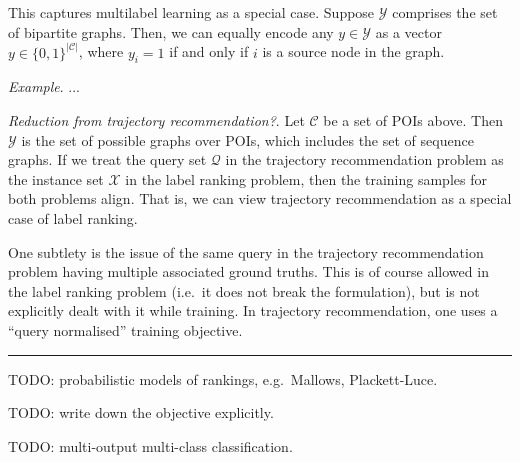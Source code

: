 \documentclass{article}
\newcommand{\eg}{e.g.\ }
\newcommand{\ie}{i.e.\ }
\newcommand{\CCal}{\mathscr{C}}
\newcommand{\QCal}{\mathscr{Q}}
\newcommand{\XCal}{\mathscr{X}}
\newcommand{\YCal}{\mathscr{Y}}
\begin{document}
This captures multilabel learning as a special case.
Suppose $\YCal$ comprises the set of bipartite graphs.
Then, we can equally encode any $y \in \YCal$
as a vector $y \in \{ 0, 1 \}^{|\CCal|}$,
where $y_i = 1$ if and only if $i$ is a source node in the graph.

\emph{Example}.
...

\emph{Reduction from trajectory recommendation?}.
Let $\CCal$ be a set of POIs above.
Then $\YCal$ is the set of possible graphs over POIs,
which includes the set of sequence graphs.
If we treat the query set $\QCal$ in the trajectory recommendation problem as the instance set $\XCal$ in the label ranking problem,
then the training samples for both problems align.
That is, we can view trajectory recommendation as a special case of label ranking.

One subtlety is the issue of the same query in the trajectory recommendation problem having multiple associated ground truths. 
This is of course allowed in the label ranking problem (\ie it does not break the formulation),
but is not explicitly dealt with it while training.
In trajectory recommendation, one uses a ``query normalised'' training objective.

\vspace{12pt}
\hrule
\vspace{12pt}

{\color{red} TODO: probabilistic models of rankings, \eg Mallows, Plackett-Luce.}

{\color{red} TODO: write down the objective explicitly.}

{\color{red} TODO: multi-output multi-class classification.}
\end{document}
